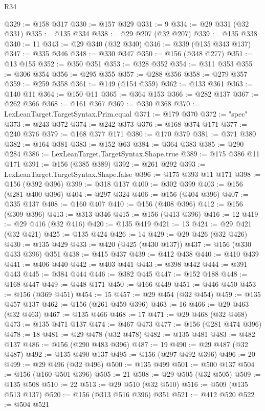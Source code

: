 \begin{lexlean}{R34}
\begin{coremodule}
@329 := @158 @317
@330 := @157 @329
@331 := 9
@334 := @29 @331 (@32 @331)
@335 := @135 @334
@338 := @29 @207 (@32 @207)
@339 := @135 @338
@340 := 11
@343 := @29 @340 (@32 @340)
@346 := @339 (@135 @343 @137)
@347 := @335 @346
@348 := @330 @347
@350 := @156 (@348 @277)
@351 := @13 @155
@352 := @350 @351
@353 := @328 @352
@354 := @311 @353
@355 := @306 @354
@356 := @295 @355
@357 := @288 @356
@358 := @279 @357
@359 := @259 @358
@361 := @149 (@154 @359)
@362 := @133 @361
@363 := @140 @11
@364 := @150 @11
@365 := @364 @153
@366 := @282 @137
@367 := @262 @366
@368 := @161 @367
@369 := @330 @368
@370 := LexLeanTarget.TargetSyntax.Prim.equal
@371 := @179 @370
@372 := "spec"
@373 := @243 @372
@374 := @242 @373
@376 := @168 @374 @171
@377 := @240 @376
@379 := @168 @377 @171
@380 := @170 @379
@381 := @371 @380
@382 := @164 @381
@383 := @152 @63
@384 := @364 @383
@385 := @290 @284
@386 := LexLeanTarget.TargetSyntax.Shape.true
@389 := @175 @386 @11 @171
@391 := @156 (@385 @389)
@392 := @261 @292
@393 := LexLeanTarget.TargetSyntax.Shape.false
@396 := @175 @393 @11 @171
@398 := @156 (@392 @396)
@399 := @318 @137
@400 := @302 @399
@403 := @156 (@281 @400 @396)
@404 := @297 @324
@406 := @156 (@404 @396)
@407 := @335 @137
@408 := @160 @407
@410 := @156 (@408 @396)
@412 := @156 (@309 @396)
@413 := @313 @346
@415 := @156 (@413 @396)
@416 := 12
@419 := @29 @416 (@32 @416)
@420 := @135 @419
@421 := 13
@424 := @29 @421 (@32 @421)
@425 := @135 @424
@426 := 14
@429 := @29 @426 (@32 @426)
@430 := @135 @429
@433 := @420 (@425 (@430 @137))
@437 := @156 (@330 @433 @396) @351
@438 := @415 @437
@439 := @412 @438
@440 := @410 @439
@441 := @406 @440
@442 := @403 @441
@443 := @398 @442
@444 := @391 @443
@445 := @384 @444
@446 := @382 @445
@447 := @152 @188
@448 := @168 @447
@449 := @448 @171
@450 := @166 @449
@451 := @446 @450
@453 := @156 (@369 @451)
@454 := 15
@457 := @29 @454 (@32 @454)
@459 := @135 @457 @137
@462 := @156 (@261 @459 @396)
@463 := 16
@466 := @29 @463 (@32 @463)
@467 := @135 @466
@468 := 17
@471 := @29 @468 (@32 @468)
@473 := @135 @471 @137
@474 := @467 @473
@477 := @156 (@281 @474 @396)
@478 := 18
@481 := @29 @478 (@32 @478)
@482 := @135 @481
@483 := @482 @137
@486 := @156 (@290 @483 @396)
@487 := 19
@490 := @29 @487 (@32 @487)
@492 := @135 @490 @137
@495 := @156 (@297 @492 @396)
@496 := 20
@499 := @29 @496 (@32 @496)
@500 := @135 @499
@501 := @500 @137
@504 := @156 (@160 @501 @396)
@505 := 21
@508 := @29 @505 (@32 @505)
@509 := @135 @508
@510 := 22
@513 := @29 @510 (@32 @510)
@516 := @509 (@135 @513 @137)
@520 := @156 (@313 @516 @396) @351
@521 := @412 @520
@522 := @504 @521

\end{coremodule}
\end{lexlean}
